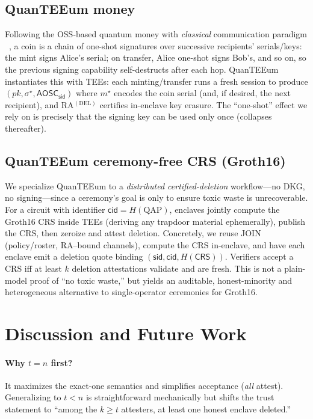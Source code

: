 \documentclass[runningheads,orivec]{llncs}
\newcommand{\prot}{\textsf{QuanTEEum}}
\newcommand{\sid}{\mathsf{sid}}
\begin{document}
\subsection{QuanTEEum money}
Following the OSS-based quantum money with \emph{classical} communication paradigm ~\cite{shmueli2025one}, a coin is a chain of one-shot signatures over successive recipients’ serials/keys: the mint signs Alice’s serial; on transfer, Alice one-shot signs Bob’s, and so on, so the previous signing capability self-destructs after each hop. \prot{} instantiates this with TEEs: each minting/transfer runs a fresh session to produce $(pk,\sigma^{\star},\mathsf{AOSC}_\sid)$ where $m^{\star}$ encodes the coin serial (and, if desired, the next recipient), and RA$^{(\mathrm{DEL})}$ certifies in-enclave key erasure. The “one-shot” effect we rely on is precisely that the signing key can be used only once (collapses thereafter).

\subsection{QuanTEEum ceremony-free CRS (Groth16)}
We specialize \prot{} to a \emph{distributed certified-deletion} workflow—no DKG, no signing—since a ceremony’s goal is only to ensure toxic waste is unrecoverable. For a circuit with identifier $\mathsf{cid}=H(\text{QAP})$, enclaves jointly compute the Groth16 CRS inside TEEs (deriving any trapdoor material ephemerally), publish the CRS, then zeroize and attest deletion. Concretely, we reuse JOIN (policy/roster, RA–bound channels), compute the CRS in-enclave, and have each enclave emit a deletion quote binding $(\sid,\mathsf{cid},H(\mathsf{CRS}))$. Verifiers accept a CRS iff at least $k$ deletion attestations validate and are fresh. This is not a plain-model proof of “no toxic waste,” but yields an auditable, honest-minority and heterogeneous alternative to single-operator ceremonies for Groth16.

\section{Discussion and Future Work}\label{sec:discussion}

\paragraph{Why $t\!=\!n$ first?}
It maximizes the exact-one semantics and simplifies acceptance (\emph{all} attest). Generalizing to $t<n$ is straightforward mechanically but shifts the trust statement to “among the $k\!\ge\!t$ attesters, at least one honest enclave deleted.”
\end{document}
